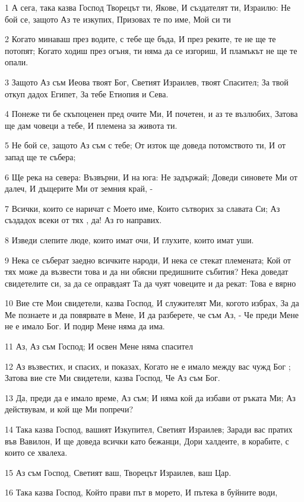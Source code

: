 \par 1 А сега, така казва Господ Творецът ти, Якове, И създателят ти, Израилю: Не бой се, защото Аз те изкупих, Призовах те по име, Мой си ти
\par 2 Когато минаваш през водите, с тебе ще бъда, И през реките, те не ще те потопят; Когато ходиш през огъня, ти няма да се изгориш, И пламъкът не ще те опали.
\par 3 Защото Аз съм Иеова твоят Бог, Светият Израилев, твоят Спасител; За твой откуп дадох Египет, За тебе Етиопия и Сева.
\par 4 Понеже ти бе скъпоценен пред очите Ми, И почетен, и аз те възлюбих, Затова ще дам човеци а тебе, И племена за живота ти.
\par 5 Не бой се, защото Аз съм с тебе; От изток ще доведа потомството ти, И от запад ще те събера;
\par 6 Ще река на севера: Възвърни, И на юга: Не задържай; Доведи синовете Ми от далеч, И дъщерите Ми от земния край, -
\par 7 Всички, които се наричат с Моето име, Които сътворих за славата Си; Аз създадох всеки от тях , да! Аз го направих.
\par 8 Изведи слепите люде, които имат очи, И глухите, които имат уши.
\par 9 Нека се съберат заедно всичките народи, И нека се стекат племената; Кой от тях може да възвести това и да ни обясни предишните събития? Нека доведат свидетелите си, за да се оправдаят Та да чуят човеците и да рекат: Това е вярно
\par 10 Вие сте Мои свидетели, казва Господ, И служителят Ми, когото избрах, За да Ме познаете и да повярвате в Мене, И да разберете, че съм Аз, - Че преди Мене не е имало Бог. И подир Мене няма да има.
\par 11 Аз, Аз съм Господ; И освен Мене няма спасител
\par 12 Аз възвестих, и спасих, и показах, Когато не е имало между вас чужд Бог ; Затова вие сте Ми свидетели, казва Господ, Че Аз съм Бог.
\par 13 Да, преди да е имало време, Аз съм; И няма кой да избави от ръката Ми; Аз действувам, и кой ще Ми попречи?
\par 14 Така казва Господ, вашият Изкупител, Светият Израилев; Заради вас пратих във Вавилон, И ще доведа всички като бежанци, Дори халдеите, в корабите, с които се хвалеха.
\par 15 Аз съм Господ, Светият ваш, Творецът Израилев, ваш Цар.
\par 16 Така казва Господ, Който прави път в морето, И пътека в буйните води,
